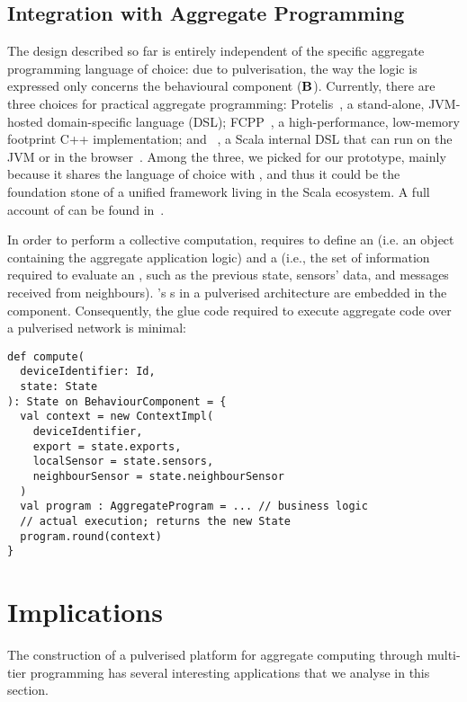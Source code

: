 \subsection{Integration with Aggregate Programming}
\label{scafiloci}

The design described so far is entirely independent of the specific aggregate programming language of choice:
due to pulverisation, the way the logic is expressed only concerns the behavioural component ($\mathbf{B}$).
%
Currently, there are three choices for practical aggregate programming:
Protelis~\cite{PianiniSAC2015}, a stand-alone, JVM-hosted domain-specific language (DSL);
FCPP~\cite{DBLP:conf/acsos/Audrito20}, a high-performance, low-memory footprint C++ implementation;
and \scafi{}~\cite{DBLP:conf/isola/CasadeiVAD20}, a Scala internal DSL that can run on the JVM or in the browser~\cite{DBLP:conf/coordination/AguzziCMPV21}.
%
Among the three, we picked \scafi{} for our prototype,
mainly because it shares the language of choice with \scalaloci{},
and thus it could be the foundation stone of a unified framework living in the Scala ecosystem.  A full account of \scafi{} can be found in~\cite{DBLP:journals/eaai/CasadeiVAPD21}.

In order to perform a collective computation, \scafi{} requires to define an  (i.e. an object containing the aggregate application logic) and 
a  (i.e., the set of information required to evaluate an , such as the previous state, sensors' data, and messages received from neighbours).
%
\scafi{}'s s in a pulverised architecture are embedded in the  component.
%
Consequently, the glue code required to execute \scafi{} aggregate code over a pulverised network is minimal:
\begin{verbatim}
def compute(
  deviceIdentifier: Id,
  state: State
): State on BehaviourComponent = {
  val context = new ContextImpl(
    deviceIdentifier,
    export = state.exports,
    localSensor = state.sensors,
    neighbourSensor = state.neighbourSensor
  )
  val program : AggregateProgram = ... // business logic
  // actual execution; returns the new State
  program.round(context)
}
\end{verbatim}
\section{Implications}
\label{implicitation}
The construction of a pulverised platform for aggregate computing through multi-tier programming has several interesting applications that we analyse in this section.


